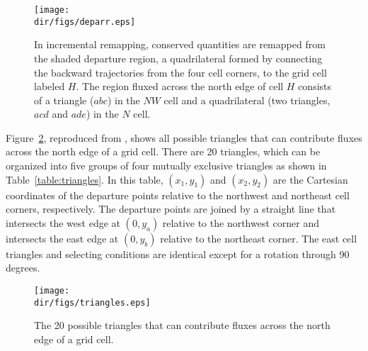 \begin{figure}
  \label{fig:gliss.deparr}
  \centering
    \texttt{[image: \\dir/figs/deparr.eps]}
    \caption{In incremental remapping, conserved
      quantities are remapped from the shaded departure region, a
      quadrilateral formed by connecting the backward trajectories
      from the four cell corners, to the grid cell labeled $H$.
      The region fluxed across the north edge of cell $H$ consists
      of a triangle ($abc$) in the $NW$ cell and a quadrilateral 
      (two triangles, $acd$ and $ade$) in the $N$ cell.}
\end{figure}

Figure~\ref{fig:gliss.triangles}, reproduced from \citet{Dukowicz2000}, shows all possible
triangles that can contribute fluxes across the north edge of a
grid cell.  There are 20 triangles, which can be organized into
five groups of four mutually exclusive triangles as shown in
Table~\ref{table:triangles}. In this table, $(x_1, y_1)$ and $(x_2,y_2)$ are the
Cartesian coordinates of the departure points relative to the
northwest and northeast cell corners, respectively.  The departure
points are joined by a straight line that intersects the west edge
at $(0,y_a)$ relative to the northwest corner and intersects the
east edge at $(0,y_b)$ relative to the northeast corner. The east cell
triangles and selecting conditions are identical except for a
rotation through 90 degrees.

\begin{figure}
  \label{fig:gliss.triangles}
  \centering
    \texttt{[image: \\dir/figs/triangles.eps]}
  \caption{The 20 possible triangles that can
    contribute fluxes across the north edge of a grid cell.}
\end{figure}


